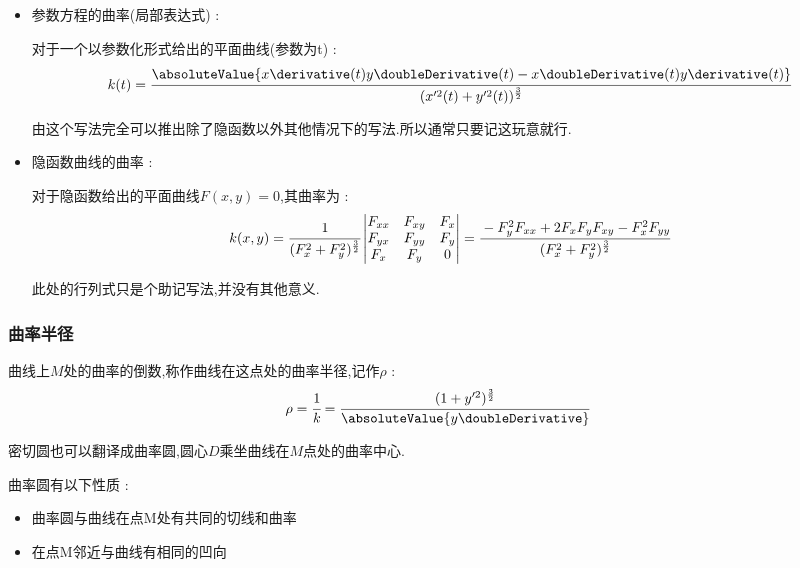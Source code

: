{{{\begin{itemize}
{          若曲线$y = \defFunction{x}$,其曲率为 : $$
            k(x) = \cfrac{\absoluteValue{f\doubleDerivative(x)}}{(1 + f^{\prime 2}(x))^{\frac{3}{2}}}
          $$

          对于极坐标方程给出的曲线$r = r(\theta)$,其曲率为 : $$
            k(\theta) = \cfrac{\absoluteValue{r^2 + 2r^{\prime 2} - rr\doubleDerivative}}{(r^2 + (r\derivative)^2)^{\frac{3}{2}}}
          $$
          }
    \item {
          参数方程的曲率(局部表达式) :

          对于一个以参数化形式给出的平面曲线(参数为t) : $$
            k(t) = \cfrac{\absoluteValue{x\derivative(t)y\doubleDerivative(t) - x\doubleDerivative(t)y\derivative(t)}}{(x^{\prime 2}(t) + y^{\prime 2}(t))^\frac{3}{2}}
          $$

          由这个写法完全可以推出除了隐函数以外其他情况下的写法.所以通常只要记这玩意就行.
          }
    \item {
          隐函数曲线的曲率 :

          对于隐函数给出的平面曲线$F(x,y) = 0$,其曲率为 : $$
            k(x,y) = \cfrac{1}{(F^2_x + F^2_y)^{\frac{3}{2}}}\begin{vmatrix}
              F_{xx} & F_{xy} & F_x \\
              F_{yx} & F_{yy} & F_y \\
              F_x    & F_y    & 0
            \end{vmatrix}
            =
            \cfrac{-F^2_yF_{xx} + 2F_xF_yF_{xy} - F^2_xF_{yy}}{(F^2_x + F^2_y)^{\frac{3}{2}}}
          $$

          此处的行列式只是个助记写法,并没有其他意义.
          }
  \end{itemize}
}%

\subsubsection{曲率半径}{
  曲线上$M$处的曲率的倒数,称作曲线在这点处的曲率半径,记作$\rho$ : $$
    \rho = \cfrac{1}{k} = \cfrac{(1 + y^{\prime 2})^{\frac{3}{2}}}{\absoluteValue{y\doubleDerivative}}
  $$

  密切圆也可以翻译成曲率圆,圆心$D$乘坐曲线在$M$点处的曲率中心.

  曲率圆有以下性质 : \begin{itemize}
    \item 曲率圆与曲线在点M处有共同的切线和曲率
    \item 在点M邻近与曲线有相同的凹向
  \end{itemize}

}}}
